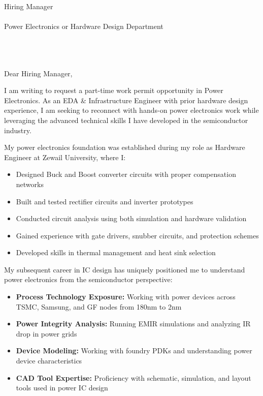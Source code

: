 \documentclass[11pt,a4paper]{letter}
\date{\today}
\begin{document}
\begin{letter}{
    Hiring Manager\\\\
    Power Electronics or Hardware Design Department\\\\
    [Company Name]\\\\
    [Company Address]
}

\opening{Dear Hiring Manager,}

I am writing to request a part-time work permit opportunity in Power Electronics. As an EDA \& Infrastructure Engineer with prior hardware design experience, I am seeking to reconnect with hands-on power electronics work while leveraging the advanced technical skills I have developed in the semiconductor industry.

My power electronics foundation was established during my role as Hardware Engineer at Zewail University, where I:
\begin{itemize}
    \item Designed Buck and Boost converter circuits with proper compensation networks
    \item Built and tested rectifier circuits and inverter prototypes
    \item Conducted circuit analysis using both simulation and hardware validation
    \item Gained experience with gate drivers, snubber circuits, and protection schemes
    \item Developed skills in thermal management and heat sink selection
\end{itemize}

My subsequent career in IC design has uniquely positioned me to understand power electronics from the semiconductor perspective:
\begin{itemize}
    \item \textbf{Process Technology Exposure:} Working with power devices across TSMC, Samsung, and GF nodes from 180nm to 2nm
    \item \textbf{Power Integrity Analysis:} Running EMIR simulations and analyzing IR drop in power grids
    \item \textbf{Device Modeling:} Working with foundry PDKs and understanding power device characteristics
    \item \textbf{CAD Tool Expertise:} Proficiency with schematic, simulation, and layout tools used in power IC design
\end{itemize}


\end{letter}
\end{document}
